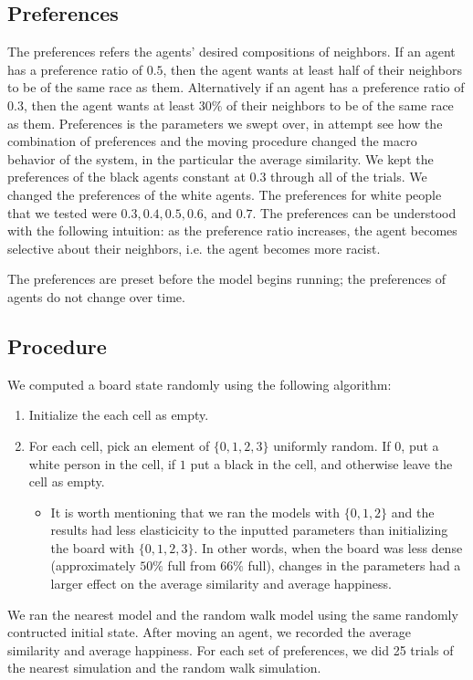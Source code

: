 \documentclass[11pt,twoside]{amsart}
\theoremstyle{theorem}
\theoremstyle{definition}
\theoremstyle{remark}
\begin{document}
\subsection{Preferences}
The preferences refers the agents' desired compositions of neighbors.
If an agent has a preference ratio of $0.5$, then the agent wants at least half of their neighbors to be of the same race as them.
Alternatively if an agent has a preference ratio of $0.3$, then the agent wants at least $30\%$ of their neighbors to be of the same race as them.
Preferences is the parameters we swept over, in attempt see how the combination of preferences and the moving procedure changed the macro behavior of the system, in the particular the average similarity.
We kept the preferences of the black agents constant at $0.3$ through all of the trials.
We changed the preferences of the white agents. 
The preferences for white people that we tested were $0.3, 0.4, 0.5, 0.6$, and $0.7$. 
The preferences can be understood with the following intuition: as the preference ratio increases, the agent becomes selective about their neighbors, i.e. the agent becomes more racist. 

The preferences are preset before the model begins running; the preferences of agents do not change over time. 


\subsection{Procedure}
We computed a board state randomly using the following algorithm: 
\begin{enumerate}
    \item Initialize the each cell as empty.
    \item For each cell, pick an element of $\{0,1,2,3\}$ uniformly random. If $0$, put a white person in the cell, if $1$ put a black in the cell, and otherwise leave the cell as empty.
        \begin{itemize}
            \item It is worth mentioning that we ran the models with $\{0,1,2\}$ and the results had less elasticicity to the inputted parameters than initializing the board with $\{0,1,2,3\}$. In other words, when the board was less dense (approximately $50\%$ full from $66\%$ full), changes in the parameters had a larger effect on the average similarity and average happiness. 
        \end{itemize}
\end{enumerate}
We ran the nearest model and the random walk model using the same randomly contructed initial state. 
After moving an agent, we recorded the average similarity and average happiness. 
For each set of preferences, we did 25 trials of the nearest simulation and the random walk simulation.
\end{document}
